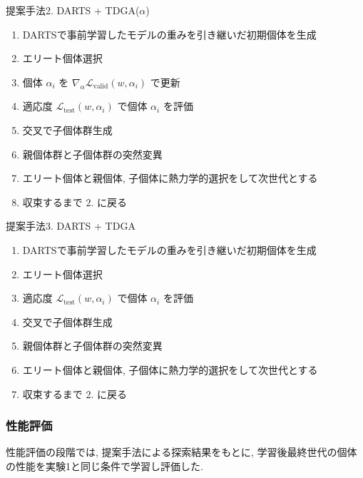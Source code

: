 \begin{algorithm}
  \caption{提案手法2. DARTS + TDGA($\alpha$)}
  \label{alg2}
  \begin{enumerate}
    \item DARTSで事前学習したモデルの重みを引き継いだ初期個体を生成
    \item エリート個体選択
    \item 個体 $\alpha_i$ を $\displaystyle \nabla_\alpha \mathcal{L}_{\mathrm{valid}}(w, \alpha_i)$ で更新
    \item 適応度 $\displaystyle \mathcal{L}_{\mathrm{test}}(w, \alpha_i)$ で個体 $\alpha_i$ を評価
    \item 交叉で子個体群生成
    \item 親個体群と子個体群の突然変異
    \item エリート個体と親個体, 子個体に熱力学的選択をして次世代とする
    \item 収束するまで 2. に戻る
  \end{enumerate}
\end{algorithm}

\begin{algorithm}
  \caption{提案手法3. DARTS + TDGA}
  \label{alg3}
  \begin{enumerate}
    \item DARTSで事前学習したモデルの重みを引き継いだ初期個体を生成
    \item エリート個体選択
    \item 適応度 $\displaystyle \mathcal{L}_{\mathrm{test}}(w, \alpha_i)$ で個体 $\alpha_i$ を評価
    \item 交叉で子個体群生成
    \item 親個体群と子個体群の突然変異
    \item エリート個体と親個体, 子個体に熱力学的選択をして次世代とする
    \item 収束するまで 2. に戻る
  \end{enumerate}
\end{algorithm}




\subsubsection{性能評価}

性能評価の段階では, 提案手法による探索結果をもとに,
学習後最終世代の個体の性能を実験1と同じ条件で学習し評価した.


